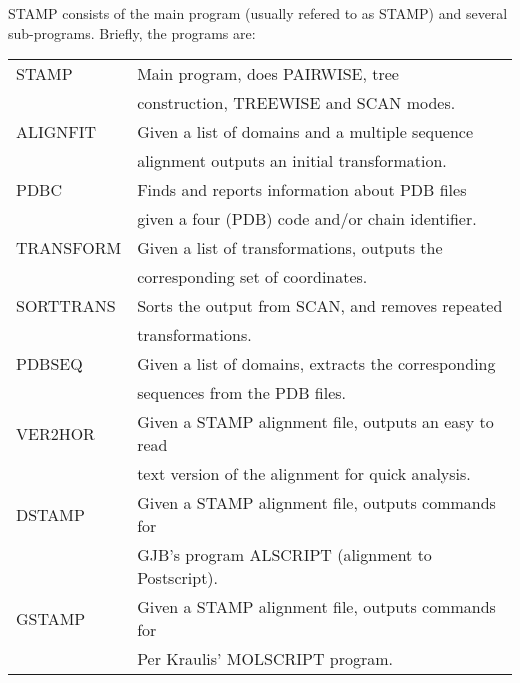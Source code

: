 STAMP consists of the main program (usually refered to as STAMP)
and several  sub-programs.  Briefly, the programs are:\\


\begin{center}
\begin{tabular}{|ll|}
\hline
STAMP   &   Main program, does PAIRWISE, tree \\
        &   construction, TREEWISE and SCAN modes.\\
\hline
ALIGNFIT &   Given a list of domains and a multiple sequence \\   
        &      alignment outputs an initial transformation.\\
\hline
PDBC    &    Finds and reports information about PDB files\\
        &     given a four (PDB) code and/or chain identifier.\\ 
\hline
TRANSFORM  & Given a list of transformations, outputs the\\ 
            & corresponding set of coordinates.\\
\hline
SORTTRANS & Sorts the output from SCAN, and removes repeated \\ 
          &   transformations. \\
\hline
PDBSEQ   & Given a list of domains, extracts the corresponding \\
         &    sequences from the PDB files.\\
\hline
VER2HOR  & Given a STAMP alignment file, outputs an easy to read\\
         &    text version of the alignment for quick analysis.\\
\hline
DSTAMP   & Given a STAMP alignment file, outputs commands for\\
         &    GJB's program ALSCRIPT (alignment to Postscript).\\
\hline
GSTAMP   & Given a STAMP alignment file, outputs commands for\\
         &    Per Kraulis' MOLSCRIPT program.\\
\hline
\end{tabular}
\end{center}

